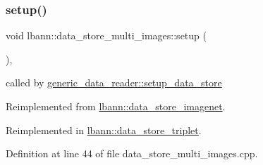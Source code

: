 \subsubsection{\texorpdfstring{setup()}{setup()}}
{\footnotesize\ttfamily void lbann\+::data\+\_\+store\+\_\+multi\+\_\+images\+::setup (\begin{DoxyParamCaption}{ }\end{DoxyParamCaption})\hspace{0.3cm}{\ttfamily [override]}, {\ttfamily [virtual]}}



called by \hyperlink{classlbann_1_1generic__data__reader_a8b2a09d38512fc11f1b9d572c89100a7}{generic\+\_\+data\+\_\+reader\+::setup\+\_\+data\+\_\+store} 



Reimplemented from \hyperlink{classlbann_1_1data__store__imagenet_a611aa1734a491c443396a077b49fe4fe}{lbann\+::data\+\_\+store\+\_\+imagenet}.



Reimplemented in \hyperlink{classlbann_1_1data__store__triplet_aca66b9cf71d7ba2b9870e76c5b92b5e8}{lbann\+::data\+\_\+store\+\_\+triplet}.



Definition at line 44 of file data\+\_\+store\+\_\+multi\+\_\+images.\+cpp.


